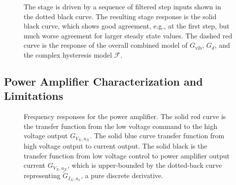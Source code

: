 \documentclass[twocolumn,twoside]{IEEEtran}
\newcommand{\Gv}{\ensuremath{G_{\text{vib}}}\xspace}
\begin{document}
\begin{figure}
  
  \caption{The stage is driven by a sequence of filtered step inputs shown in the dotted black curve. The resulting stage response is the solid black curve, which shows good agreement, e.g., at the first step, but much worse agreement for larger steady state values. The dashed red curve is the response of the overall combined model of $\Gv$, $G_{d}$, and the complex hysteresis model $\mathcal{F}$.}
  \label{fig:hyst_resp_dem}
\end{figure}


\subsection{Power Amplifier Characterization and Limitations}\label{sec:powcharct}
\begin{figure}[htbp]
\centering

\caption{
  Frequency responses for the power amplifier. The solid red curve is the transfer function from the low voltage command to the high voltage output $G_{V_X, u_X}$. The solid blue curve transfer function from high voltage output to current output. The solid black is the transfer function from low voltage control to power amplifier output current $G_{V_X, u_X}$, which is upper-bounded by the dotted-back curve representing $\tilde G_{I_X, u_x}$, a pure discrete derivative.}
\label{fig:powTF}
\end{figure}
\end{document}
